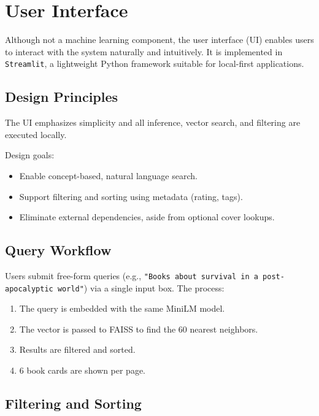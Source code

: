 \chapter{User Interface}
\label{chapter:interface}

Although not a machine learning component, the user interface (UI) enables users to interact with the system naturally and intuitively. It is implemented in \texttt{Streamlit}, a lightweight Python framework suitable for local-first applications.

\section{Design Principles}
\label{sec:ui-design}

The UI emphasizes simplicity and all inference, vector search, and filtering are executed locally.

Design goals:

\begin{itemize}
    \item Enable concept-based, natural language search.
    \item Support filtering and sorting using metadata (rating, tags).
    \item Eliminate external dependencies, aside from optional cover lookups.
\end{itemize}

\section{Query Workflow}
\label{sec:ui-query-workflow}

Users submit free-form queries (e.g., \texttt{"Books about survival in a post-apocalyptic world"}) via a single input box.
The process:

\begin{enumerate}
    \item The query is embedded with the same MiniLM model.
    \item The vector is passed to FAISS to find the 60 nearest neighbors.
    \item Results are filtered and sorted.
    \item 6 book cards are shown per page.
\end{enumerate}

\section{Filtering and Sorting}
\label{sec:ui-filtering}

